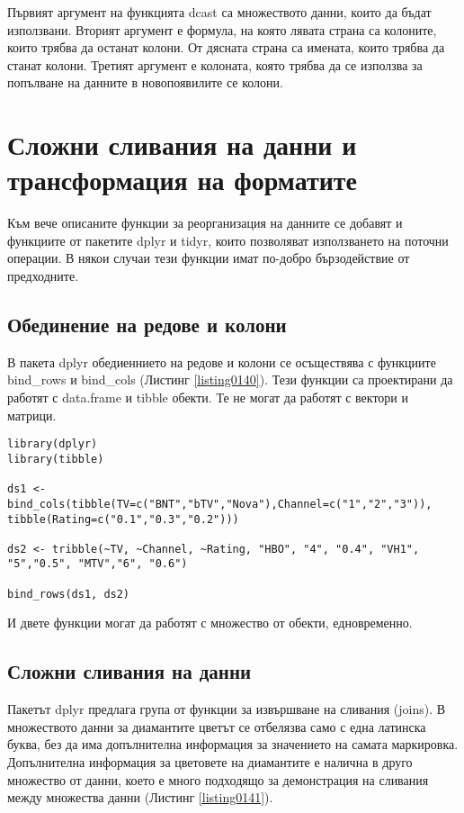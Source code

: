 Първият аргумент на функцията dcast са множеството данни, които да бъдат използвани. Вторият аргумент е формула, на която лявата страна са колоните, които трябва да останат колони. От дясната страна са имената, които трябва да станат колони. Третият аргумент е колоната, която трябва да се използва за попълване на данните в новопоявилите се колони.

\section{Сложни сливания на данни и трансформация на форматите}

Към вече описаните функции за реорганизация на данните се добавят и функциите от пакетите dplyr и tidyr, които позволяват използването на поточни операции. В някои случаи тези функции имат по-добро бързодействие от предходните.

\subsection{Обединение на редове и колони}

В пакета dplyr обедиеннието на редове и колони се осъществява с функциите bind\_rows и bind\_cols (Листинг \ref{listing0140}). Тези функции са проектирани да работят с data.frame и tibble обекти. Те не могат да работят с вектори и матрици.

\begin{lstlisting}[caption=Обединяване по колони и редове, label=listing0140]
library(dplyr)
library(tibble)

ds1 <- bind_cols(tibble(TV=c("BNT","bTV","Nova"),Channel=c("1","2","3")), tibble(Rating=c("0.1","0.3","0.2")))

ds2 <- tribble(~TV, ~Channel, ~Rating, "HBO", "4", "0.4", "VH1", "5","0.5", "MTV","6", "0.6")

bind_rows(ds1, ds2)
\end{lstlisting}

И двете функции могат да работят с множество от обекти, едновременно.

\subsection{Сложни сливания на данни}

Пакетът dplyr предлага група от функции за извършване на сливания (joins). В множеството данни за диамантите цветът се отбелязва само с една латинска буква, без да има допълнителна информация за значението на самата маркировка. Допълнителна информация за цветовете на диамантите е налична в друго множество от данни, което е много подходящо за демонстрация на сливания между множества данни (Листинг \ref{listing0141}).

